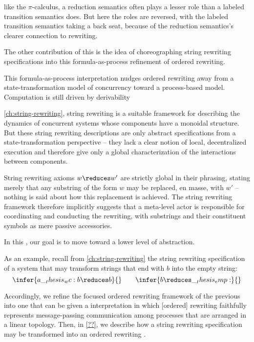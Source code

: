  like the $\pi$-calculus, a reduction semantics often plays a lesser role than a labeled transition semantics does.
But here the roles are reversed, with the labeled transition semantics taking a back seat, because of the reduction semantics's clearer connection to rewriting.

The other contribution of this  is the idea of choreographing string rewriting specifications into this formula-as-process refinement of ordered rewriting.

This formula-as-process interpretation nudges ordered rewriting away from a state-transformation model of concurrency toward a process-based model.
Computation is still driven by derivability



 \cref{ch:string-rewriting}, string rewriting is a suitable framework for describing the dynamics of concurrent systems whose components have a monoidal structure.
But these string rewriting descriptions are only abstract specifications from a state-transformation perspective -- they lack a clear notion of local, decentralized execution and therefore give only a global characterization of the interactions between components.

String rewriting axioms $w \reduces w'$ are strictly global in their phrasing, stating merely that any substring of the form $w$ may be replaced, en masse, with $w'$ -- nothing is said about how this replacement is achieved.
The string rewriting framework therefore implicitly suggests that a meta-level actor is responsible for coordinating and conducting the rewriting, with substrings and their constituent symbols as mere passive accessories.

In this , our goal is to move toward a lower level of abstraction.


As an example, recall from \cref{ch:string-rewriting} the string rewriting specification of a system that may transform strings that end with $b$ into the empty string:
\begin{equation}
  \infer{a \wc b \reduces b}{}
  \qquad
  \infer{b \reduces \emp}{}
\end{equation}


Accordingly, we refine the focused ordered rewriting framework of the previous  into one that can be given a  interpretation in which [ordered] rewriting faithfully represents message-passing communication among processes that are arranged in a linear topology.
Then, in \cref{??}, we describe how a string rewriting specification may be transformed into an ordered rewriting .

